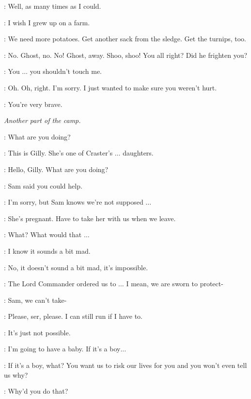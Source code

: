 \GRENN: Well, as many times as I could.

\SAM: I wish I grew up on a farm.

\EDD: We need more potatoes. Get another sack from the sledge. Get the turnips, too.



\SAM: No. Ghost, no. No! Ghost, away. Shoo, shoo! You all right? Did he frighten you?

\GILLY: You $\ldots$ you shouldn't touch me.

\SAM: Oh. Oh, right. I'm sorry. I just wanted to make sure you weren't hurt.

\GILLY: You're very brave.


\scene

\textit{Another part of the camp.}


\JON: What are you doing?

\SAM: This is Gilly. She's one of Craster's $\ldots$ daughters.

\JON: Hello, Gilly. What are you doing?

\GILLY: Sam said you could help.

\JON: I'm sorry, but Sam knows we're not supposed $\ldots$

\SAM: She's pregnant. Have to take her with us when we leave.

\JON: What? What would that $\ldots$

\SAM: I know it sounds a bit mad.

\JON: No, it doesn't sound a bit mad, it's impossible.

\SAM: The Lord Commander ordered us to $\ldots$ I mean, we are sworn to protect-

\JON: Sam, we can't take-

\GILLY: Please, ser, please. I can still run if I have to.

\JON: It's just not possible.

\GILLY: I'm going to have a baby. If it's a boy$\ldots$

\JON: If it's a boy, what? You want us to risk our lives for you and you won't even tell us why?


\SAM: Why'd you do that?

